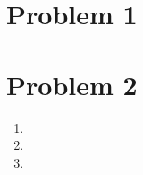 \documentclass[letterpaper]{article}
\begin{document}
\section*{Problem 1}
\newpage
\section*{Problem 2}
\begin{enumerate}[label=(\alph*)]
\item %
\item %
\item %
\end{enumerate}
\end{document}
